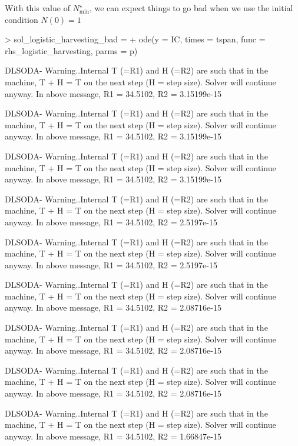 \documentclass[aspectratio=169]{beamer}
\begin{document}
\begin{frame}[fragile]
With this value of $N_{\text{min}}^\star$, we can expect things to go bad when we use the initial condition $N(0)=1$
\vfill
\begin{Schunk}
\begin{Sinput}
> sol_logistic_harvesting_bad =
+   ode(y = IC, times = tspan, func = rhs_logistic_harvesting, parms = p)
\end{Sinput}
\begin{Soutput}
DLSODA-  Warning..Internal T (=R1) and H (=R2) are
      such that in the machine, T + H = T on the next step  
     (H = step size). Solver will continue anyway.
In above message, R1 = 34.5102, R2 = 3.15199e-15
 
DLSODA-  Warning..Internal T (=R1) and H (=R2) are
      such that in the machine, T + H = T on the next step  
     (H = step size). Solver will continue anyway.
In above message, R1 = 34.5102, R2 = 3.15199e-15
 
DLSODA-  Warning..Internal T (=R1) and H (=R2) are
      such that in the machine, T + H = T on the next step  
     (H = step size). Solver will continue anyway.
In above message, R1 = 34.5102, R2 = 3.15199e-15
 
DLSODA-  Warning..Internal T (=R1) and H (=R2) are
      such that in the machine, T + H = T on the next step  
     (H = step size). Solver will continue anyway.
In above message, R1 = 34.5102, R2 = 2.5197e-15
 
DLSODA-  Warning..Internal T (=R1) and H (=R2) are
      such that in the machine, T + H = T on the next step  
     (H = step size). Solver will continue anyway.
In above message, R1 = 34.5102, R2 = 2.5197e-15
 
DLSODA-  Warning..Internal T (=R1) and H (=R2) are
      such that in the machine, T + H = T on the next step  
     (H = step size). Solver will continue anyway.
In above message, R1 = 34.5102, R2 = 2.08716e-15
 
DLSODA-  Warning..Internal T (=R1) and H (=R2) are
      such that in the machine, T + H = T on the next step  
     (H = step size). Solver will continue anyway.
In above message, R1 = 34.5102, R2 = 2.08716e-15
 
DLSODA-  Warning..Internal T (=R1) and H (=R2) are
      such that in the machine, T + H = T on the next step  
     (H = step size). Solver will continue anyway.
In above message, R1 = 34.5102, R2 = 2.08716e-15
 
DLSODA-  Warning..Internal T (=R1) and H (=R2) are
      such that in the machine, T + H = T on the next step  
     (H = step size). Solver will continue anyway.
In above message, R1 = 34.5102, R2 = 1.66847e-15
 

\end{Soutput}
\end{Schunk}
\end{frame}
\end{document}
